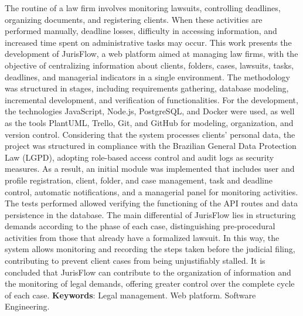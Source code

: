 \begin{ABSTRACT}
\thispagestyle{empty}
The routine of a law firm involves monitoring lawsuits, controlling deadlines, organizing documents, and registering clients. When these activities are performed manually, deadline losses, difficulty in 
accessing information, and increased time spent on administrative tasks may occur. This work presents the development of JurisFlow, a web platform aimed at managing law firms, with the objective of centralizing 
information about clients, folders, cases, lawsuits, tasks, deadlines, and managerial indicators in a single environment. The methodology was structured in stages, including requirements gathering, database modeling, 
incremental development, and verification of functionalities. For the development, the technologies JavaScript, Node.js, PostgreSQL, and Docker were used, as well as the tools PlantUML, Trello, Git, 
and GitHub for modeling, organization, and version control. Considering that the system processes clients' personal data, the project was structured in compliance with the Brazilian General Data Protection Law (LGPD), 
adopting role-based access control and audit logs as security measures. As a result, an initial module was implemented that includes user and profile registration, client, folder, and case management, 
task and deadline control, automatic notifications, and a managerial panel for monitoring activities. The tests performed allowed verifying the functioning of the API routes and data persistence in the database. 
The main differential of JurisFlow lies in structuring demands according to the phase of each case, distinguishing pre-procedural activities from those that already have a formalized lawsuit. 
In this way, the system allows monitoring and recording the steps taken before the judicial filing, contributing to prevent client cases from being unjustifiably stalled. It is concluded that JurisFlow can 
contribute to the organization of information and the monitoring of legal demands, offering greater control over the complete cycle of each case.
\vspace*{0.5cm}
\noindent\textbf{Keywords}: Legal management. Web platform. Software Engineering.
\end{ABSTRACT}
